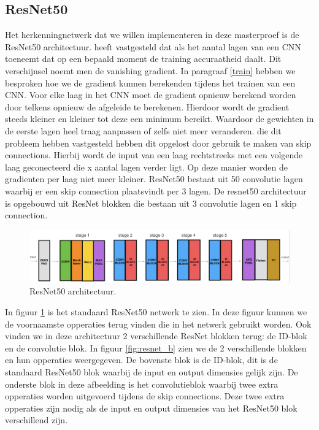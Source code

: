 \subsection{ResNet50} \label{resnet}
Het herkenningnetwerk dat we willen implementeren in deze masterproef is de ResNet50 architectuur.
\cite{he2015deep} heeft vastgesteld dat als het aantal lagen van een CNN toeneemt dat op een bepaald moment de training accuraatheid daalt.
Dit verschijnsel noemt men de vanishing gradient.
In paragraaf \ref{train} hebben we besproken hoe we de gradient kunnen berekenden tijdens het trainen van een CNN.
Voor elke laag in het CNN moet de gradient opnieuw berekend worden door telkens opnieuw de afgeleide te berekenen.
Hierdoor wordt de gradient steeds kleiner en kleiner tot deze een minimum bereikt.
Waardoor de gewichten in de eerste lagen heel traag aanpassen of zelfs niet meer veranderen.
\cite{he2015deep} die dit probleem hebben vastgesteld hebben dit opgelost door gebruik te maken van skip connections.
Hierbij wordt de input van een laag rechtstreeks met een volgende laag geconecteerd die x aantal lagen verder ligt.
Op deze manier worden de gradienten per laag niet meer kleiner.
ResNet50 bestaat uit 50 convolutie lagen waarbij er een skip connection plaatsvindt per 3 lagen.
De resnet50 architectuur is opgebouwd uit ResNet blokken die bestaan uit 3 convolutie lagen en 1 skip connection.

\begin{figure}[!ht]
	\centering
	\includegraphics[width=1.0\linewidth]{fig/resnet50.png}
	\caption{ResNet50 architectuur.}
	\label{fig:resnet}
\end{figure}

In figuur \ref{fig:resnet} is het standaard ResNet50 netwerk te zien.
In deze figuur kunnen we de voornaamste opperaties terug vinden die in het netwerk gebruikt worden.
Ook vinden we in deze architectuur 2 verschillende ResNet blokken terug: de ID-blok en de convolutie blok.
In figuur \ref{fig:resnet_b} zien we de 2 verschillende blokken en hun opperaties weergegeven.
De bovenste blok is de ID-blok, dit is de standaard ResNet50 blok waarbij de input en output dimensies gelijk zijn.
De onderste blok in deze afbeelding is het convolutieblok waarbij twee extra opperaties worden uitgevoerd tijdens de skip connections.
Deze twee extra opperaties zijn nodig als de input en output dimensies van het ResNet50 blok verschillend zijn.

